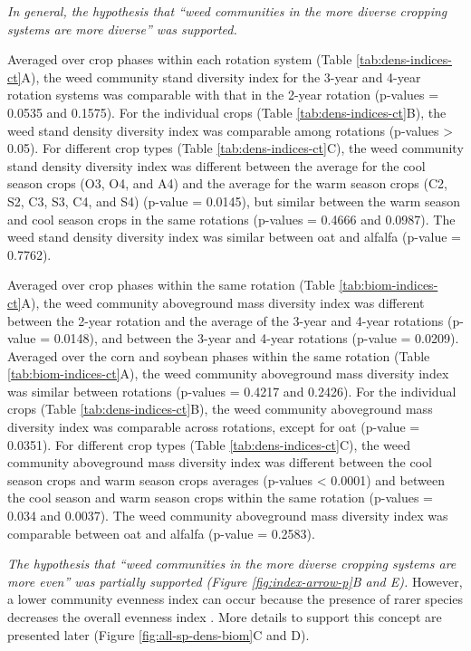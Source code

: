 \documentclass[
]{article}
\begin{document}
\emph{In general, the hypothesis that ``weed communities in the more diverse cropping systems are more diverse'' was supported.}

Averaged over crop phases within each rotation system (Table \ref{tab:dens-indices-ct}A), the weed community stand diversity index for the 3-year and 4-year rotation systems was comparable with that in the 2-year rotation (p-values = 0.0535 and 0.1575). For the individual crops (Table \ref{tab:dens-indices-ct}B), the weed stand density diversity index was comparable among rotations (p-values \textgreater{} 0.05). For different crop types (Table \ref{tab:dens-indices-ct}C), the weed community stand density diversity index was different between the average for the cool season crops (O3, O4, and A4) and the average for the warm season crops (C2, S2, C3, S3, C4, and S4) (p-value = 0.0145), but similar between the warm season and cool season crops in the same rotations (p-values = 0.4666 and 0.0987). The weed stand density diversity index was similar between oat and alfalfa (p-value = 0.7762).

Averaged over crop phases within the same rotation (Table \ref{tab:biom-indices-ct}A), the weed community aboveground mass diversity index was different between the 2-year rotation and the average of the 3-year and 4-year rotations (p-value = 0.0148), and between the 3-year and 4-year rotations (p-value = 0.0209). Averaged over the corn and soybean phases within the same rotation (Table \ref{tab:biom-indices-ct}A), the weed community aboveground mass diversity index was similar between rotations (p-values = 0.4217 and 0.2426). For the individual crops (Table \ref{tab:dens-indices-ct}B), the weed community aboveground mass diversity index was comparable across rotations, except for oat (p-value = 0.0351). For different crop types (Table \ref{tab:dens-indices-ct}C), the weed community aboveground mass diversity index was different between the cool season crops and warm season crops averages (p-values \textless{} 0.0001) and between the cool season and warm season crops within the same rotation (p-values = 0.034 and 0.0037). The weed community aboveground mass diversity index was comparable between oat and alfalfa (p-value = 0.2583).

\emph{The hypothesis that ``weed communities in the more diverse cropping systems are more even'' was partially supported (Figure \ref{fig:index-arrow-p}B and E).} However, a lower community evenness index can occur because the presence of rarer species decreases the overall evenness index \citep{stirlingEmpiricalRelationshipsSpecies2001}. More details to support this concept are presented later (Figure \ref{fig:all-sp-dens-biom}C and D).
\end{document}
